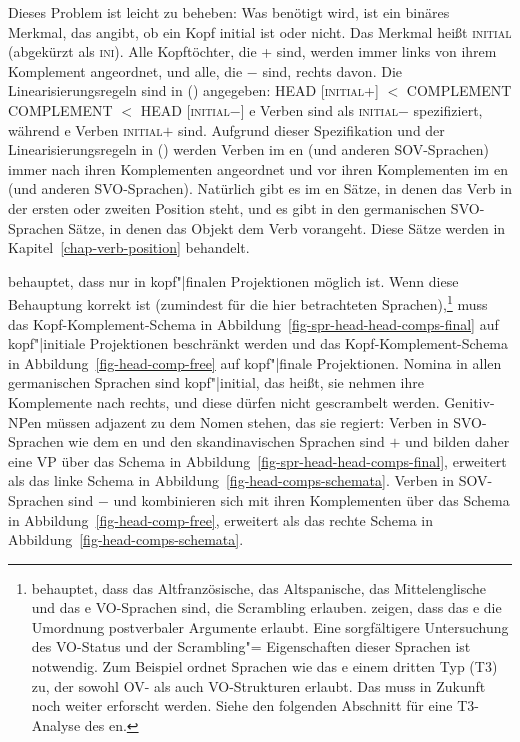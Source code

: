 Dieses Problem ist leicht zu beheben: Was benötigt wird, ist ein binäres Merkmal, das angibt, ob ein Kopf
initial ist oder nicht. Das Merkmal heißt \textsc{initial} (abgekürzt als \textsc{ini}). Alle
Kopftöchter, die \ini+ sind, werden immer links von ihrem Komplement angeordnet, und alle,
die \ini$-$ sind, rechts davon. Die Linearisierungsregeln sind in () angegeben:
\eal
\label{lp-regeln}
\ex HEAD [\textsc{initial}+] $<$ COMPLEMENT
\ex COMPLEMENT $<$  HEAD [\textsc{initial}$-$]
\zl
{}e Verben sind als \textsc{initial}$-$ spezifiziert, während e Verben
\textsc{initial}$+$ sind. Aufgrund dieser Spezifikation und der Linearisierungsregeln in () werden Verben
im en (und anderen SOV-Sprachen) immer nach ihren Komplementen angeordnet und vor ihren
Komplementen im en (und anderen SVO-Sprachen). Natürlich gibt es im en Sätze, in denen
das Verb in der ersten oder zweiten Position steht, und es gibt in den germanischen SVO-Sprachen Sätze, in
denen das Objekt dem Verb vorangeht. Diese Sätze werden in
Kapitel~\ref{chap-verb-position} behandelt.

\citet[]{Haider2020a} behauptet, dass  nur in
kopf"|finalen Projektionen möglich ist. Wenn diese Behauptung korrekt ist (zumindest für die
hier betrachteten Sprachen),\footnote{
  \citet[]{Santorini93a} behauptet, dass das Altfranzösische, das Altspanische, das Mittelenglische und das e
  VO-Sprachen sind, die Scrambling erlauben. \citet*{TGC2021a-u} zeigen, dass das e die Umordnung postverbaler
  Argumente erlaubt. Eine sorgfältigere Untersuchung des VO-Status und der Scrambling"=%
  Eigenschaften dieser Sprachen ist notwendig. Zum Beispiel ordnet \citet[Abschnitt~3]{Haider2021a} Sprachen wie das e einem
  dritten Typ (T3) zu, der sowohl OV- als auch VO-Strukturen erlaubt. Das muss in Zukunft noch
  weiter erforscht werden. Siehe den folgenden Abschnitt für eine T3-Analyse des en.
} muss das Kopf-Komplement-Schema in Abbildung~\ref{fig-spr-head-head-comps-final} auf
kopf"|initiale Projektionen beschränkt werden und das Kopf-Komplement-Schema in Abbildung~\ref{fig-head-comp-free} auf
kopf"|finale Projektionen. Nomina in allen germanischen Sprachen sind kopf"|initial, das heißt, sie nehmen ihre
Komplemente nach rechts, und diese dürfen nicht gescrambelt werden. Genitiv-NPen müssen adjazent zu
dem Nomen stehen, das sie regiert:
\eal
{}
\zl
Verben in SVO-Sprachen wie dem en und den skandinavischen Sprachen sind \initial{}$+$ und bilden daher eine
VP über das Schema in Abbildung~\ref{fig-spr-head-head-comps-final}, erweitert als das linke Schema in
Abbildung~\ref{fig-head-comps-schemata}. Verben in SOV-Sprachen sind \initial{}$-$ und kombinieren sich mit ihren
Komplementen über das Schema in Abbildung~\ref{fig-head-comp-free}, erweitert als das rechte Schema in
Abbildung~\ref{fig-head-comps-schemata}.

